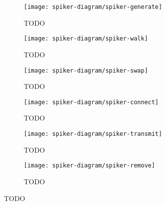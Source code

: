 \begin{figure*}[!htbp]
\begin{center}
\begin{subfigure}[b]{0.33\linewidth}
  \texttt{[image: spiker-diagram/spiker-generate]}
  \caption{TODO}
  \label{fig:TODO}
\end{subfigure}
\begin{subfigure}[b]{0.33\linewidth}
  \texttt{[image: spiker-diagram/spiker-walk]}
  \caption{TODO}
  \label{fig:TODO}
\end{subfigure}
\begin{subfigure}[b]{0.33\linewidth}
  \texttt{[image: spiker-diagram/spiker-swap]}
  \caption{TODO}
  \label{fig:TODO}
\end{subfigure}
\begin{subfigure}[b]{0.33\linewidth}
  \texttt{[image: spiker-diagram/spiker-connect]}
  \caption{TODO}
  \label{fig:TODO}
\end{subfigure}
\begin{subfigure}[b]{0.33\linewidth}
  \texttt{[image: spiker-diagram/spiker-transmit]}
  \caption{TODO}
  \label{fig:TODO}
\end{subfigure}
\begin{subfigure}[b]{0.33\linewidth}
  \texttt{[image: spiker-diagram/spiker-remove]}
  \caption{TODO}
  \label{fig:TODO}
\end{subfigure}
\caption{
TODO
}
\label{fig:spiker_diagram}
\end{center}
\end{figure*}
